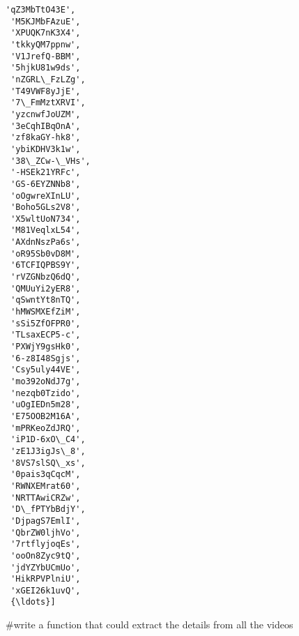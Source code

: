 \documentclass[11pt]{article}
\begin{document}
\begin{tcolorbox}[breakable, size=fbox, boxrule=.5pt, pad at break*=1mm, opacityfill=0]
\begin{Verbatim}[commandchars=\\\{\}]
 'qZ3MbTtO43E',
 'M5KJMbFAzuE',
 'XPUQK7nK3X4',
 'tkkyQM7ppnw',
 'V1JrefQ-BBM',
 '5hjkU81w9ds',
 'nZGRL\_FzLZg',
 'T49VWF8yJjE',
 '7\_FmMztXRVI',
 'yzcnwfJoUZM',
 '3eCqhIBqOnA',
 'zf8kaGY-hk8',
 'ybiKDHV3k1w',
 '38\_ZCw-\_VHs',
 '-HSEk21YRFc',
 'GS-6EYZNNb8',
 'oOgwreXInLU',
 'Boho5GLs2V8',
 'X5wltUoN734',
 'M81VeqlxL54',
 'AXdnNszPa6s',
 'oR95Sb0vD8M',
 '6TCFIQPBS9Y',
 'rVZGNbzQ6dQ',
 'QMUuYi2yER8',
 'qSwntYt8nTQ',
 'hMWSMXEfZiM',
 'sSi5ZfOFPR0',
 'TLsaxECP5-c',
 'PXWjY9gsHk0',
 '6-z8I48Sgjs',
 'Csy5uly44VE',
 'mo392oNdJ7g',
 'nezqb0Tzido',
 'uOgIEDn5m28',
 'E75OOB2M16A',
 'mPRKeoZdJRQ',
 'iP1D-6xO\_C4',
 'zE1J3igJs\_8',
 '8VS7slSQ\_xs',
 '0pais3qCqcM',
 'RWNXEMrat60',
 'NRTTAwiCRZw',
 'D\_fPTYbBdjY',
 'DjpagS7EmlI',
 'QbrZW0ljhVo',
 '7rtflyjoqEs',
 'ooOn8Zyc9tQ',
 'jdYZYbUCmUo',
 'HikRPVPlniU',
 'xGEI26k1uvQ',
 {\ldots}]
\end{Verbatim}
\end{tcolorbox}
        
    \#write a function that could extract the details from all the videos
\end{document}
